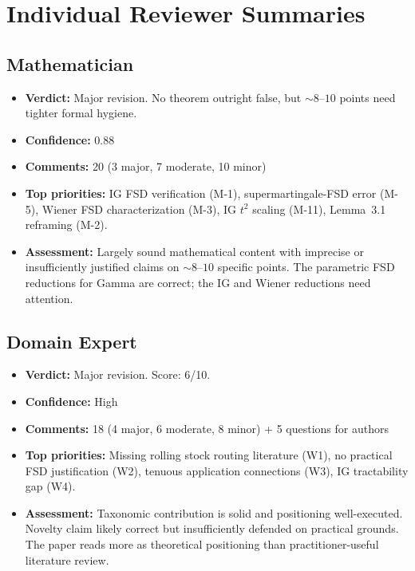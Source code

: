 \documentclass[11pt,a4paper]{article}
\begin{document}
\newpage
\appendix
\section{Individual Reviewer Summaries}

\subsection{Mathematician}
\begin{itemize}[nosep,leftmargin=1.5em]
  \item \textbf{Verdict:} Major revision. No theorem outright false, but ${\sim}8$--$10$ points need tighter formal hygiene.
  \item \textbf{Confidence:} 0.88
  \item \textbf{Comments:} 20 (3 major, 7 moderate, 10 minor)
  \item \textbf{Top priorities:} IG FSD verification (M-1), supermartingale-FSD error (M-5), Wiener FSD characterization (M-3), IG $t^2$ scaling (M-11), Lemma~3.1 reframing (M-2).
  \item \textbf{Assessment:} Largely sound mathematical content with imprecise or insufficiently justified claims on ${\sim}8$--$10$ specific points. The parametric FSD reductions for Gamma are correct; the IG and Wiener reductions need attention.
\end{itemize}

\subsection{Domain Expert}
\begin{itemize}[nosep,leftmargin=1.5em]
  \item \textbf{Verdict:} Major revision. Score: 6/10.
  \item \textbf{Confidence:} High
  \item \textbf{Comments:} 18 (4 major, 6 moderate, 8 minor) + 5 questions for authors
  \item \textbf{Top priorities:} Missing rolling stock routing literature (W1), no practical FSD justification (W2), tenuous application connections (W3), IG tractability gap (W4).
  \item \textbf{Assessment:} Taxonomic contribution is solid and positioning well-executed. Novelty claim likely correct but insufficiently defended on practical grounds. The paper reads more as theoretical positioning than practitioner-useful literature review.
\end{itemize}
\end{document}
